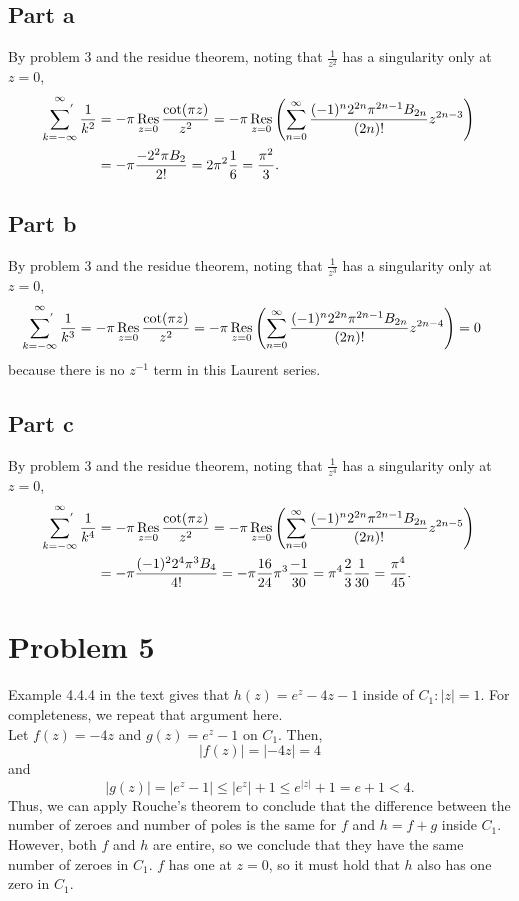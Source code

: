 \documentclass{article}
\begin{document}
\subsection{Part a}
By problem 3 and the residue theorem, noting that $\frac{1}{z^2}$ has a singularity only at $z=0$,
\begin{align*}
\sideset{}{^{'}}\sum_{k=-\infty}^\infty \frac{1}{k^2}&=-\pi\operatorname*{Res}_{z=0}\frac{\cot(\pi z)}{z^2}=-\pi\operatorname*{Res}_{z=0}\left(\sum_{n=0}^\infty \frac{(-1)^n2^{2n}\pi^{2n-1}B_{2n}}{(2n)!}z^{2n-3}\right)\\&=
-\pi\frac{-2^2\pi B_2}{2!}=2\pi^2\frac{1}{6}=\frac{\pi^2}{3}.
\end{align*}

\subsection{Part b}
By problem 3 and the residue theorem, noting that $\frac{1}{z^3}$ has a singularity only at $z=0$,
\begin{align*}
\sideset{}{^{'}}\sum_{k=-\infty}^\infty \frac{1}{k^3}&=-\pi\operatorname*{Res}_{z=0}\frac{\cot(\pi z)}{z^2}=-\pi\operatorname*{Res}_{z=0}\left(\sum_{n=0}^\infty \frac{(-1)^n2^{2n}\pi^{2n-1}B_{2n}}{(2n)!}z^{2n-4}\right)=0
\end{align*}
because there is no $z^{-1}$ term in this Laurent series.

\subsection{Part c}
By problem 3 and the residue theorem, noting that $\frac{1}{z^4}$ has a singularity only at $z=0$,
\begin{align*}
\sideset{}{^{'}}\sum_{k=-\infty}^\infty \frac{1}{k^4}&=-\pi\operatorname*{Res}_{z=0}\frac{\cot(\pi z)}{z^2}=-\pi\operatorname*{Res}_{z=0}\left(\sum_{n=0}^\infty \frac{(-1)^n2^{2n}\pi^{2n-1}B_{2n}}{(2n)!}z^{2n-5}\right)\\&=
-\pi\frac{(-1)^22^4\pi^3 B_4}{4!}=-\pi\frac{16}{24}\pi^3\frac{-1}{30}=\pi^4\frac{2}{3}\frac{1}{30}=\frac{\pi^4}{45}.
\end{align*}

\section{Problem 5}
Example 4.4.4 in the text gives that $h(z)=e^z-4z-1$ inside of $C_1: |z|=1$. For completeness, we repeat that argument here. \\
Let $f(z)=-4z$ and $g(z)=e^z-1$ on $C_1$. Then,
\[
|f(z)|=|-4z|=4
\]
and 
\[
|g(z)|=|e^z-1|\leq|e^z|+1\leq e^{|z|}+1=e+1<4.
\]
Thus, we can apply Rouche's theorem to conclude that the difference between the number of zeroes and number of poles is the same for $f$ and $h=f+g$ inside $C_1$. However, both $f$ and $h$ are entire, so we conclude that they have the same number of zeroes in $C_1$. $f$ has one at $z=0$, so it must hold that $h$ also has one zero in $C_1$.
\end{document}
